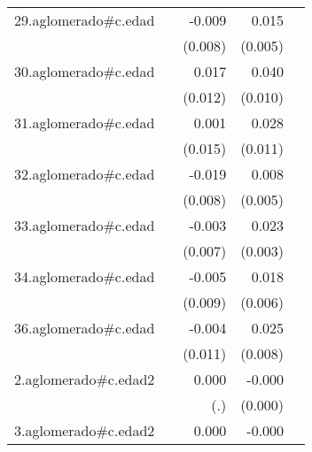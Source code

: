 {\begin{longtable}{l*{4}{D{.}{.}{-1}}}
\addlinespace
29.aglomerado#c.edad&                     &      -0.009         &       0.015\sym{**} &                     \\
            &                     &     (0.008)         &     (0.005)         &                     \\
\addlinespace
30.aglomerado#c.edad&                     &       0.017         &       0.040\sym{***}&                     \\
            &                     &     (0.012)         &     (0.010)         &                     \\
\addlinespace
31.aglomerado#c.edad&                     &       0.001         &       0.028\sym{*}  &                     \\
            &                     &     (0.015)         &     (0.011)         &                     \\
\addlinespace
32.aglomerado#c.edad&                     &      -0.019\sym{*}  &       0.008         &                     \\
            &                     &     (0.008)         &     (0.005)         &                     \\
\addlinespace
33.aglomerado#c.edad&                     &      -0.003         &       0.023\sym{***}&                     \\
            &                     &     (0.007)         &     (0.003)         &                     \\
\addlinespace
34.aglomerado#c.edad&                     &      -0.005         &       0.018\sym{**} &                     \\
            &                     &     (0.009)         &     (0.006)         &                     \\
\addlinespace
36.aglomerado#c.edad&                     &      -0.004         &       0.025\sym{**} &                     \\
            &                     &     (0.011)         &     (0.008)         &                     \\
\addlinespace
2.aglomerado#c.edad2&                     &       0.000         &      -0.000\sym{***}&                     \\
            &                     &         (.)         &     (0.000)         &                     \\
\addlinespace
3.aglomerado#c.edad2&                     &       0.000         &      -0.000         &                     \\

\end{longtable}}

